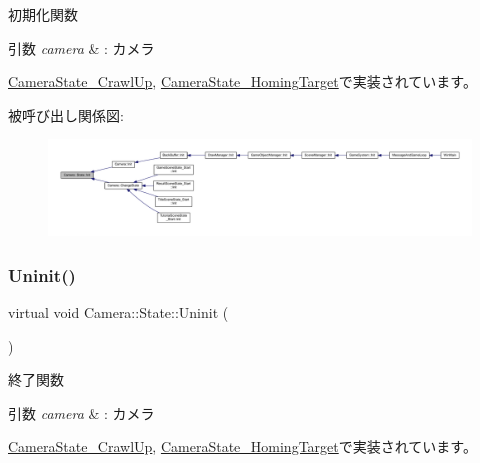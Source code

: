 初期化関数 


\begin{DoxyParams}{引数}
{\em camera} & \+: カメラ \\
\hline
\end{DoxyParams}


\mbox{\hyperlink{class_camera_state___crawl_up_a43a47eb4e7445c6801e8316c5a635709}{Camera\+State\+\_\+\+Crawl\+Up}}, \mbox{\hyperlink{class_camera_state___homing_target_a9222190a5f26d564e99623b05941d382}{Camera\+State\+\_\+\+Homing\+Target}}で実装されています。

被呼び出し関係図\+:
\nopagebreak
\begin{figure}[H]
\begin{center}
\leavevmode
\includegraphics[width=350pt]{class_camera_1_1_state_aa1b81471ab15e64b3117ffe7de9560ff_icgraph}
\end{center}
\end{figure}
\mbox{\label{class_camera_1_1_state_adb3f43b6c3f8100da7877867180e804b}} 
\subsubsection{\texorpdfstring{Uninit()}{Uninit()}}
{\footnotesize\ttfamily virtual void Camera\+::\+State\+::\+Uninit (\begin{DoxyParamCaption}{ }\end{DoxyParamCaption})\hspace{0.3cm}{\ttfamily [pure virtual]}}



終了関数 


\begin{DoxyParams}{引数}
{\em camera} & \+: カメラ \\
\hline
\end{DoxyParams}


\mbox{\hyperlink{class_camera_state___crawl_up_a046ec18a91e31b210ae000133fa6113a}{Camera\+State\+\_\+\+Crawl\+Up}}, \mbox{\hyperlink{class_camera_state___homing_target_ab2b5379b35ebafc53189bf4d45646c8c}{Camera\+State\+\_\+\+Homing\+Target}}で実装されています。

